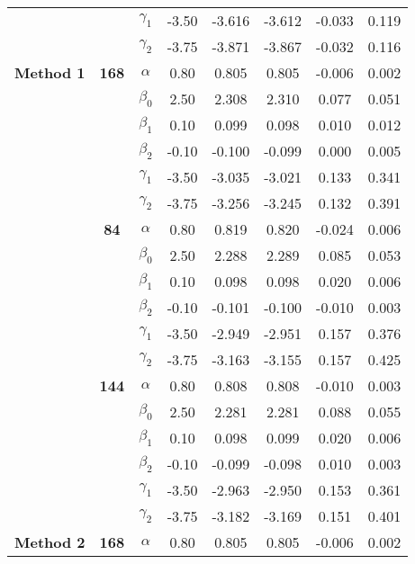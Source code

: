 \begin{table}[h]
\begin{tabular}[t]{>{}c>{}ccccccc}
 &  & $\gamma_1$ & -3.50 & -3.616 & -3.612 & -0.033 & 0.119\\

 &  & $\gamma_2$ & -3.75 & -3.871 & -3.867 & -0.032 & 0.116\\

\multirow{-18}{*}{\centering\arraybackslash \textbf{Method 1}} & \multirow{-6}{*}{\centering\arraybackslash \textbf{168}} & $\alpha$ & 0.80 & 0.805 & 0.805 & -0.006 & 0.002\\
\cmidrule{1-8}
 &  & $\beta_0$ & 2.50 & 2.308 & 2.310 & 0.077 & 0.051\\

 &  & $\beta_1$ & 0.10 & 0.099 & 0.098 & 0.010 & 0.012\\

 &  & $\beta_2$ & -0.10 & -0.100 & -0.099 & 0.000 & 0.005\\

 &  & $\gamma_1$ & -3.50 & -3.035 & -3.021 & 0.133 & 0.341\\

 &  & $\gamma_2$ & -3.75 & -3.256 & -3.245 & 0.132 & 0.391\\

 & \multirow{-6}{*}{\centering\arraybackslash \textbf{84}} & $\alpha$ & 0.80 & 0.819 & 0.820 & -0.024 & 0.006\\

 &  & $\beta_0$ & 2.50 & 2.288 & 2.289 & 0.085 & 0.053\\

 &  & $\beta_1$ & 0.10 & 0.098 & 0.098 & 0.020 & 0.006\\

 &  & $\beta_2$ & -0.10 & -0.101 & -0.100 & -0.010 & 0.003\\

 &  & $\gamma_1$ & -3.50 & -2.949 & -2.951 & 0.157 & 0.376\\

 &  & $\gamma_2$ & -3.75 & -3.163 & -3.155 & 0.157 & 0.425\\

 & \multirow{-6}{*}{\centering\arraybackslash \textbf{144}} & $\alpha$ & 0.80 & 0.808 & 0.808 & -0.010 & 0.003\\

 &  & $\beta_0$ & 2.50 & 2.281 & 2.281 & 0.088 & 0.055\\

 &  & $\beta_1$ & 0.10 & 0.098 & 0.099 & 0.020 & 0.006\\

 &  & $\beta_2$ & -0.10 & -0.099 & -0.098 & 0.010 & 0.003\\

 &  & $\gamma_1$ & -3.50 & -2.963 & -2.950 & 0.153 & 0.361\\

 &  & $\gamma_2$ & -3.75 & -3.182 & -3.169 & 0.151 & 0.401\\

\multirow{-18}{*}{\centering\arraybackslash \textbf{Method 2}} & \multirow{-6}{*}{\centering\arraybackslash \textbf{168}} & $\alpha$ & 0.80 & 0.805 & 0.805 & -0.006 & 0.002\\
\bottomrule
\end{tabular}
\end{table}
